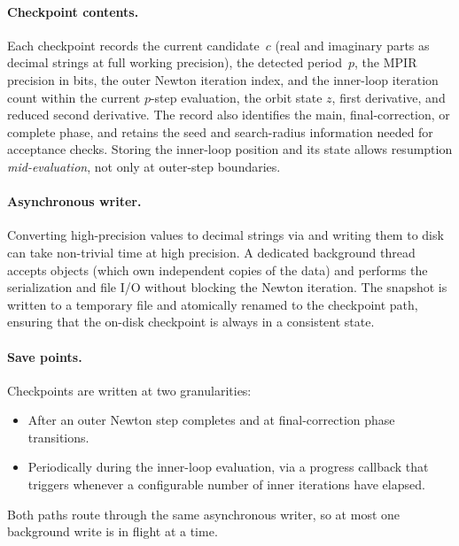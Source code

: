 \paragraph{Checkpoint contents.}
Each checkpoint records the current candidate~$c$ (real and imaginary
parts as decimal strings at full working precision), the detected
period~$p$, the MPIR precision in bits, the outer Newton iteration
index, and the inner-loop iteration count within the current $p$-step
evaluation, the orbit state $z$, first derivative, and reduced second
derivative.  The record also identifies the main, final-correction, or
complete phase, and retains the seed and search-radius information needed
for acceptance checks.  Storing the inner-loop position and its state allows resumption
\emph{mid-evaluation}, not only at outer-step boundaries.

\paragraph{Asynchronous writer.}
Converting high-precision  values to decimal strings via
 and writing them to disk can take non-trivial
time at high precision.  A dedicated  background
thread accepts  objects (which own independent
copies of the  data) and performs the serialization and
file I/O without blocking the Newton iteration.  The snapshot is
written to a temporary file and atomically renamed to the checkpoint
path, ensuring that the on-disk checkpoint is always in a consistent
state.

\paragraph{Save points.}
Checkpoints are written at two granularities:
\begin{itemize}
  \item After an outer Newton step completes and at final-correction phase
        transitions.
  \item Periodically during the inner-loop evaluation, via a progress
        callback that triggers whenever a configurable number of
        inner iterations have elapsed.
\end{itemize}
Both paths route through the same asynchronous writer, so at most one
background write is in flight at a time.

